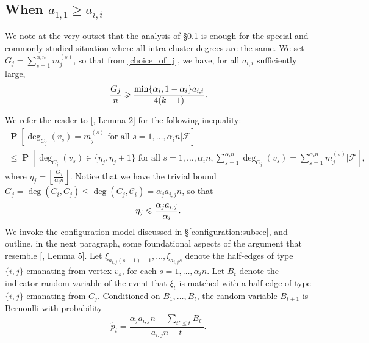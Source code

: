 \documentclass[11pt,reqno]{amsart}
\theoremstyle{definition}
\theoremstyle{remark}
\theoremstyle{conjecture}
\DeclareMathOperator{\Prob}{\mathbf{P}}
\begin{document}
\subsection{When $a_{1,1} \geqslant a_{i,i}$}\label{subcase_1} We note at the very outset that the analysis of \S\ref{subcase_1} is enough for the special and commonly studied situation where all intra-cluster degrees are the same. We set $G_{j} = \sum_{s=1}^{\alpha_{i} n} m^{(s)}_{j}$, so that from \eqref{choice_of_j}, we have, for all $a_{i,i}$ sufficiently large,
\begin{equation}\label{G_{j}_lower_bound_subcase_1}
\frac{G_{j}}{n} \geqslant \frac{\min\{\alpha_{i}, 1 - \alpha_{i}\} a_{i,i}}{4(k-1)}.
\end{equation}

We refer the reader to [\cite{09}, Lemma 2] for the following inequality: 
\begin{multline}\label{optimize_probab}
\Prob\left[\deg_{C_{j}}(v_{s}) = m^{(s)}_{j} \text{ for all } s = 1, \ldots, \alpha_{i} n\Big|\mathcal{F}\right] \\ \leqslant \Prob\left[\deg_{C_{j}}(v_{s}) \in \{\eta_{j}, \eta_{j}+1\} \text{ for all } s = 1, \ldots, \alpha_{i} n, \sum_{s=1}^{\alpha_{i} n} \deg_{C_{j}}(v_{s}) = \sum_{s=1}^{\alpha_{i} n} m^{(s)}_{j}\Big|\mathcal{F}\right], 
\end{multline}
where $\eta_{j} = \left\lfloor \frac{G_{j}}{\alpha_{i} n}\right\rfloor$. Notice that we have the trivial bound $G_{j} = \deg(C_{i}, C_{j}) \leqslant \deg(C_{j}, \mathcal{C}_{i}) = \alpha_{j} a_{i,j} n$, so that 
\begin{equation}\label{eta_{j}_upper_bound}
\eta_{j} \leqslant \frac{\alpha_{j} a_{i,j}}{\alpha_{i}}.
\end{equation}
We invoke the configuration model discussed in \S\ref{configuration:subsec}, and outline, in the next paragraph, some foundational aspects of the argument that resemble [\cite{09}, Lemma 5]. Let $\xi_{a_{i,j}(s-1)+1}, \ldots, \xi_{a_{i,j}s}$ denote the half-edges of type $\{i, j\}$ emanating from vertex $v_{s}$, for each $s = 1, \ldots, \alpha_{i} n$. Let $B_{t}$ denote the indicator random variable of the event that $\xi_{t}$ is matched with a half-edge of type $\{i, j\}$ emanating from $C_{j}$. Conditioned on $B_{1}, \ldots, B_{t}$, the random variable $B_{t+1}$ is Bernoulli with probability 
\begin{equation}
\hat{p}_{t} = \frac{\alpha_{j} a_{i,j} n - \sum_{t' \leqslant t} B_{t'}}{a_{i,j} n - t}.\nonumber
\end{equation}
\end{document}
